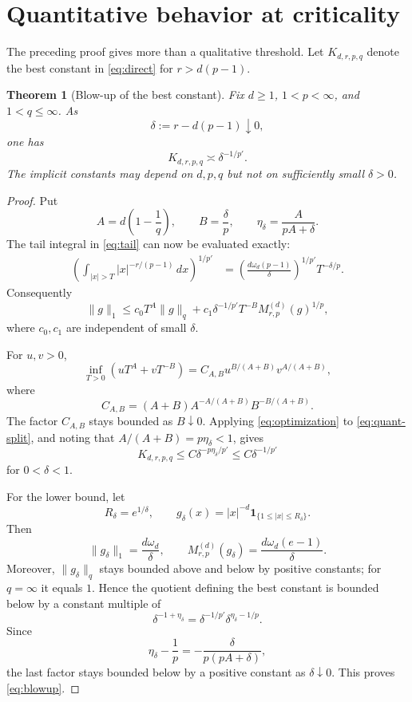 \documentclass[11pt]{amsart}
\newtheorem{theorem}{Theorem}[section]
\theoremstyle{remark}
\newcommand{\norm}[1]{\lVert #1\rVert}
\newcommand{\ind}{\mathbf 1}
\newcommand{\Mrp}{M_{r,p}^{(d)}}
\begin{document}
\section{Quantitative behavior at criticality}\label{sec:quantitative}

The preceding proof gives more than a qualitative threshold.  Let
$K_{d,r,p,q}$ denote the best constant in \eqref{eq:direct} for
$r>d(p-1)$.

\begin{theorem}[Blow-up of the best constant]\label{thm:blowup}
Fix $d\ge1$, $1<p<\infty$, and $1<q\le\infty$.  As
\[
 \delta:=r-d(p-1)\downarrow0,
\]
one has
\begin{equation}\label{eq:blowup}
 K_{d,r,p,q}\asymp \delta^{-1/p'}.
\end{equation}
The implicit constants may depend on $d,p,q$ but not on sufficiently small
$\delta>0$.
\end{theorem}

\begin{proof}
Put
\[
 A=d\left(1-\frac1q\right),
 \qquad B=\frac{\delta}{p},
 \qquad
 \eta_\delta=\frac{A}{pA+\delta}.
\]
The tail integral in \eqref{eq:tail} can now be evaluated exactly:
\begin{align*}
 \left(\int_{|x|>T}|x|^{-r/(p-1)}\,dx\right)^{1/p'}
 &=\left(\frac{d\omega_d(p-1)}{\delta}\right)^{1/p'}
 T^{-\delta/p}.
\end{align*}
Consequently
\begin{equation}\label{eq:quant-split}
 \norm{g}_1
 \le c_0T^A\norm{g}_q
 +c_1\delta^{-1/p'}T^{-B}\Mrp(g)^{1/p},
\end{equation}
where $c_0,c_1$ are independent of small $\delta$.

For $u,v>0$,
\begin{equation}\label{eq:optimization}
 \inf_{T>0}(uT^A+vT^{-B})
 =C_{A,B}u^{B/(A+B)}v^{A/(A+B)},
\end{equation}
where
\[
 C_{A,B}=(A+B)A^{-A/(A+B)}B^{-B/(A+B)}.
\]
The factor $C_{A,B}$ stays bounded as $B\downarrow0$.  Applying
\eqref{eq:optimization} to \eqref{eq:quant-split}, and noting that
$A/(A+B)=p\eta_\delta<1$, gives
\[
 K_{d,r,p,q}
 \le C\delta^{-p\eta_\delta/p'}
 \le C\delta^{-1/p'}
\]
for $0<\delta<1$.

For the lower bound, let
\[
 R_\delta=e^{1/\delta},
 \qquad
 g_\delta(x)=|x|^{-d}\ind_{\{1\le |x|\le R_\delta\}}.
\]
Then
\[
 \norm{g_\delta}_1=\frac{d\omega_d}{\delta},
 \qquad
 \Mrp(g_\delta)=\frac{d\omega_d(e-1)}{\delta}.
\]
Moreover, $\norm{g_\delta}_q$ stays bounded above and below by positive
constants; for $q=\infty$ it equals $1$.  Hence the quotient defining the
best constant is bounded below by a constant multiple of
\[
 \delta^{-1+\eta_\delta}
 =\delta^{-1/p'}\delta^{\eta_\delta-1/p}.
\]
Since
\[
 \eta_\delta-\frac1p
 =-\frac{\delta}{p(pA+\delta)},
\]
the last factor stays bounded below by a positive constant as
$\delta\downarrow0$.  This proves \eqref{eq:blowup}.
\end{proof}
\end{document}
